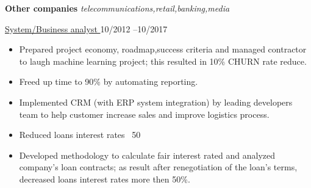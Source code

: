 \textbf{Other companies} \textit{telecommunications,retail,banking,media} \par
\underline{System/Business analyst } \hfill 10/2012 --10/2017
\begin{itemize}
	\item Prepared  project economy, roadmap,success criteria and managed contractor to laugh machine learning project; this resulted in 10\% CHURN rate  reduce.
 	\item 	Freed up time to 90\% by automating reporting.
 	\item Implemented CRM (with ERP system integration) by leading developers team to help customer increase sales and improve logistics process.
	\item Reduced loans interest rates ~50%
        \item Developed methodology to calculate fair interest rated and analyzed company's loan contracts; as result after renegotiation of the loan's terms, decreased loans interest rates more then 50\%.
\end{itemize}\par
